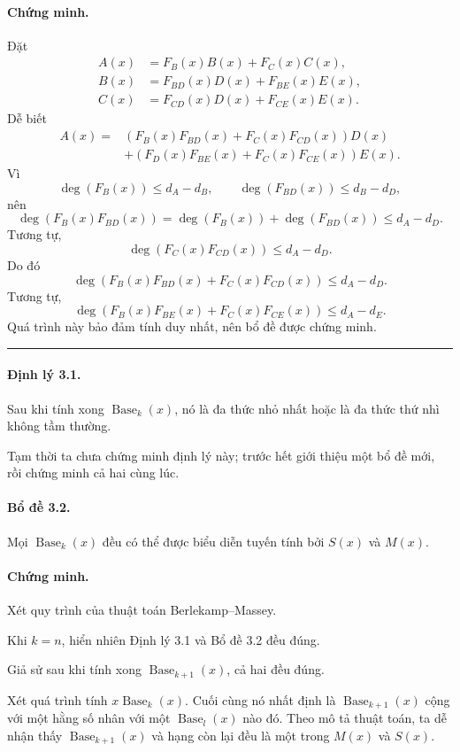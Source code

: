 \documentclass[11pt]{article}
\newcommand{\Base}{\operatorname{Base}}
\newcommand{\qedmark}{\hfill\rule{0.7ex}{0.7ex}}
\begin{document}
\paragraph{Chứng minh.}
Đặt
\[
\begin{aligned}
  A(x)&=F_B(x)B(x)+F_C(x)C(x),\\
  B(x)&=F_{BD}(x)D(x)+F_{BE}(x)E(x),\\
  C(x)&=F_{CD}(x)D(x)+F_{CE}(x)E(x).
\end{aligned}
\]
Dễ biết
\[
\begin{aligned}
  A(x)={}&(F_B(x)F_{BD}(x)+F_C(x)F_{CD}(x))D(x)\\
        &+(F_D(x)F_{BE}(x)+F_C(x)F_{CE}(x))E(x).
\end{aligned}
\]
Vì
\[
  \deg(F_B(x))\le d_A-d_B,\qquad
  \deg(F_{BD}(x))\le d_B-d_D,
\]
nên
\[
  \deg(F_B(x)F_{BD}(x))
  =\deg(F_B(x))+\deg(F_{BD}(x))
  \le d_A-d_D.
\]
Tương tự,
\[
  \deg(F_C(x)F_{CD}(x))\le d_A-d_D.
\]
Do đó
\[
  \deg(F_B(x)F_{BD}(x)+F_C(x)F_{CD}(x))\le d_A-d_D.
\]
Tương tự,
\[
  \deg(F_B(x)F_{BE}(x)+F_C(x)F_{CE}(x))\le d_A-d_E.
\]
Quá trình này bảo đảm tính duy nhất, nên bổ đề được chứng minh. \qedmark

\paragraph{Định lý 3.1.}
Sau khi tính xong \(\Base_k(x)\), nó là đa thức nhỏ nhất hoặc là đa thức thứ
nhì không tầm thường.

Tạm thời ta chưa chứng minh định lý này; trước hết giới thiệu một bổ đề mới,
rồi chứng minh cả hai cùng lúc.

\paragraph{Bổ đề 3.2.}
Mọi \(\Base_k(x)\) đều có thể được biểu diễn tuyến tính bởi \(S(x)\) và
\(M(x)\).

\paragraph{Chứng minh.}
Xét quy trình của thuật toán Berlekamp--Massey.

Khi \(k=n\), hiển nhiên Định lý 3.1 và Bổ đề 3.2 đều đúng.

Giả sử sau khi tính xong \(\Base_{k+1}(x)\), cả hai đều đúng.

Xét quá trình tính \(x\Base_k(x)\). Cuối cùng nó nhất định là
\(\Base_{k+1}(x)\) cộng với một hằng số nhân với một \(\Base_l(x)\) nào đó.
Theo mô tả thuật toán, ta dễ nhận thấy \(\Base_{k+1}(x)\) và hạng còn lại đều
là một trong \(M(x)\) và \(S(x)\).
\end{document}
